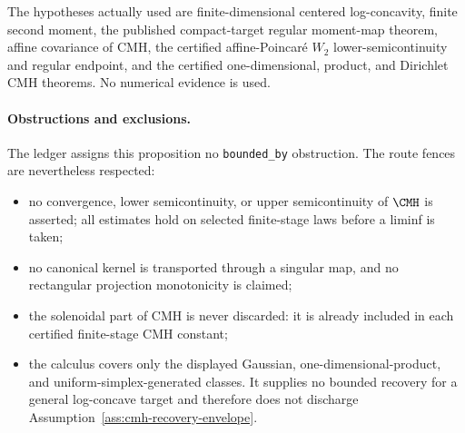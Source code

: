 \documentclass[../main.tex]{subfiles}
\begin{document}
The hypotheses actually used are finite-dimensional centered log-concavity, finite second
moment, the published compact-target regular moment-map theorem, affine covariance of CMH, the
certified affine-Poincar\'e $W_2$ lower-semicontinuity and regular endpoint, and the certified
one-dimensional, product, and Dirichlet CMH theorems.  No numerical evidence is used.

\paragraph{Obstructions and exclusions.}
The ledger assigns this proposition no \texttt{bounded\_by} obstruction.  The route fences are
nevertheless respected:
\begin{itemize}[leftmargin=1.4em]
  \item no convergence, lower semicontinuity, or upper semicontinuity of $\CMH$ is asserted;
        all estimates hold on selected finite-stage laws before a liminf is taken;
  \item no canonical kernel is transported through a singular map, and no rectangular
        projection monotonicity is claimed;
  \item the solenoidal part of CMH is never discarded: it is already included in each certified
        finite-stage CMH constant;
  \item the calculus covers only the displayed Gaussian, one-dimensional-product, and
        uniform-simplex-generated classes.  It supplies no bounded recovery for a general
        log-concave target and therefore does not discharge
        Assumption~\ref{ass:cmh-recovery-envelope}.
\end{itemize}
\end{document}
